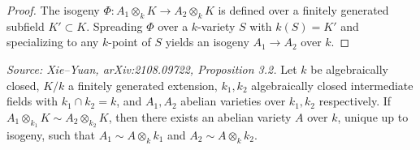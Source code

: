 \begin{proof}
  The isogeny \(\Phi\colon A_1 \otimes_k K \to A_2 \otimes_k K\) is defined over a finitely
  generated subfield \(K' \subset K\).  Spreading \(\Phi\) over a \(k\)-variety \(S\) with
  \(k(S) = K'\) and specializing to any \(k\)-point of \(S\) yields an isogeny
  \(A_1 \to A_2\) over \(k\).
\end{proof}

\begin{proposition}
  \label{pro:baseChangeDiagram}
  \textit{Source: Xie--Yuan, arXiv:2108.09722, Proposition 3.2.}
  Let \(k\) be algebraically closed, \(K/k\) a finitely generated extension,
  \(k_1, k_2\) algebraically closed intermediate fields with \(k_1 \cap k_2 = k\), and
  \(A_1, A_2\) abelian varieties over \(k_1, k_2\) respectively.
  If \(A_1 \otimes_{k_1} K \sim A_2 \otimes_{k_2} K\), then there exists an abelian variety
  \(A\) over \(k\), unique up to isogeny, such that \(A_1 \sim A \otimes_k k_1\) and
  \(A_2 \sim A \otimes_k k_2\).
\end{proposition}

